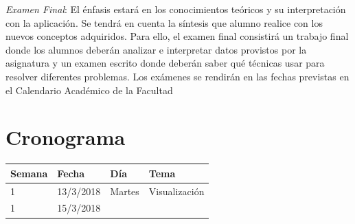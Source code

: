 \documentclass[]{book}
\theoremstyle{definition}
\theoremstyle{definition}
\theoremstyle{definition}
\theoremstyle{remark}
\begin{document}
\emph{Examen Final}: El énfasis estará en los conocimientos teóricos y
su interpretación con la aplicación. Se tendrá en cuenta la síntesis que
alumno realice con los nuevos conceptos adquiridos. Para ello, el examen
final consistirá un trabajo final donde los alumnos deberán analizar e
interpretar datos provistos por la asignatura y un examen escrito donde
deberán saber qué técnicas usar para resolver diferentes problemas. Los
exámenes se rendirán en las fechas previstas en el Calendario Académico
de la Facultad

\hypertarget{cronograma}{%
\section{Cronograma}\label{cronograma}}

\begin{longtable}[]{@{}llll@{}}
\toprule
\begin{minipage}[b]{0.05\columnwidth}\raggedright
Semana\strut
\end{minipage} & \begin{minipage}[b]{0.07\columnwidth}\raggedright
Fecha\strut
\end{minipage} & \begin{minipage}[b]{0.05\columnwidth}\raggedright
Día\strut
\end{minipage} & \begin{minipage}[b]{0.71\columnwidth}\raggedright
Tema\strut
\end{minipage}\tabularnewline
\midrule
\endhead
\begin{minipage}[t]{0.05\columnwidth}\raggedright
1\strut
\end{minipage} & \begin{minipage}[t]{0.07\columnwidth}\raggedright
13/3/2018\strut
\end{minipage} & \begin{minipage}[t]{0.05\columnwidth}\raggedright
Martes\strut
\end{minipage} & \begin{minipage}[t]{0.71\columnwidth}\raggedright
Visualización\strut
\end{minipage}\tabularnewline
\begin{minipage}[t]{0.05\columnwidth}\raggedright
1\strut
\end{minipage} & \begin{minipage}[t]{0.07\columnwidth}\raggedright
15/3/2018\strut
\end{minipage} & \begin{minipage}[t]{0.05\columnwidth}\raggedright

\end{minipage}
\end{longtable}
\end{document}
